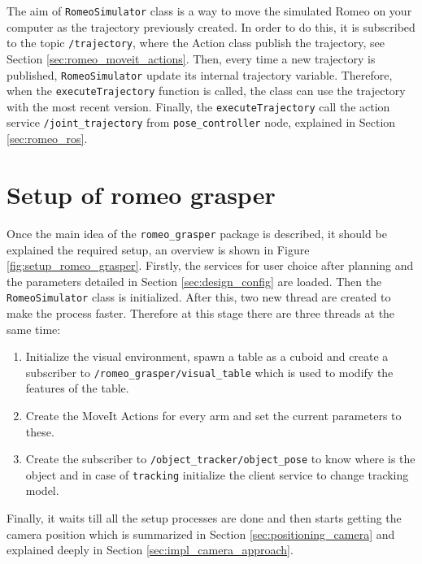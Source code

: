 \documentclass[12pt,a4paper,final,twoside,openright]{report}
\begin{document}
The aim of \texttt{RomeoSimulator} class is a way to move the simulated Romeo on your computer as the trajectory previously created. In order to do this, it is subscribed to the topic \texttt{/trajectory}, where the Action class publish the trajectory, see Section \ref{sec:romeo_moveit_actions}. Then, every time a new trajectory is published, \texttt{RomeoSimulator} update its internal trajectory variable. Therefore, when the \texttt{executeTrajectory} function is called, the class can use the trajectory with the most recent version. Finally, the \texttt{executeTrajectory} call the action service  \texttt{/joint\_trajectory} from \texttt{pose\_controller} node, explained in Section \ref{sec:romeo_ros}.

\vspace{-20pt}
\section{Setup of romeo grasper}
\label{sec:impl_setup}
\vspace{-10pt}
Once the main idea of the \texttt{romeo\_grasper} package is described, it should be explained the required setup, an overview is shown in Figure \ref{fig:setup_romeo_grasper}. Firstly, the services for user choice after planning and the parameters detailed in Section \ref{sec:design_config} are loaded. Then the \texttt{RomeoSimulator} class is initialized. After this, two new thread are created to make the process faster. Therefore at this stage there are three threads at the same time:

\begin{enumerate}
\item Initialize the visual environment, spawn a table as a cuboid and create a subscriber to \texttt{/romeo\_grasper/visual\_table} which is used to modify the features of the table.
\item Create the MoveIt Actions for every arm and set the current parameters to these.
\item Create the subscriber to \texttt{/object\_tracker/object\_pose} to know where is the object and in case of \texttt{tracking} initialize the client service to change tracking model.
\end{enumerate}

Finally, it waits till all the setup processes are done and then starts getting the camera position which is summarized in Section \ref{sec:positioning_camera} and explained deeply in Section \ref{sec:impl_camera_approach}.
\end{document}

